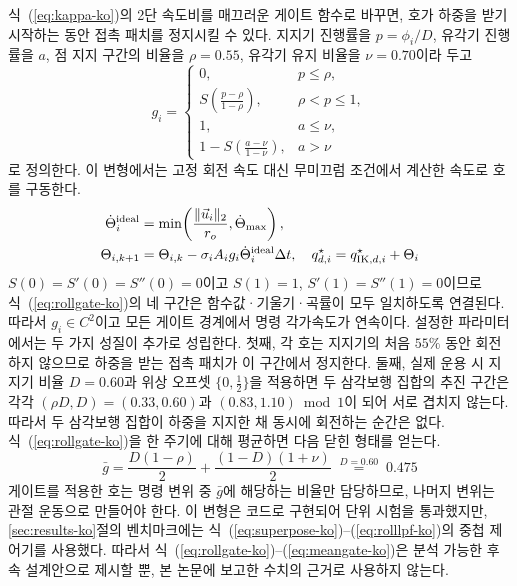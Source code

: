 식~(\ref{eq:kappa-ko})의 2단 속도비를 매끄러운 게이트 함수로 바꾸면, 호가 하중을
받기 시작하는 동안 접촉 패치를 정지시킬 수 있다. 지지기 진행률을
$p=\phi_i/D$, 유각기 진행률을 $a$, 점 지지 구간의 비율을 $\rho=0.55$, 유각기
유지 비율을 $\nu=0.70$이라 두고
\begin{equation}
 g_i=\begin{cases}
 0,&p\le\rho,\\ S\!\left(\frac{p-\rho}{1-\rho}\right),&\rho<p\le1,\\
 1,&a\le\nu,\\1-S\!\left(\frac{a-\nu}{1-\nu}\right),&a>\nu
 \end{cases}                                                   \label{eq:rollgate-ko}
\end{equation}
로 정의한다. 이 변형에서는 고정 회전 속도 대신 무미끄럼 조건에서 계산한 속도로
호를 구동한다.
\begin{align}
 \dot\Theta_i^{\rm ideal}&=\min\!\left(\frac{\|\vec{u}_i\|_2}{r_o},
 \dot\Theta_{\max}\right),                                     \label{eq:rollrate-ko}\\
 \Theta_{i,k+1}&=\Theta_{i,k}-\sigma_iA_i g_i
 \dot\Theta_i^{\rm ideal}\Delta t,\quad
 q_{d,i}^\star=q_{{\rm IK},d,i}^\star+\Theta_i                 \label{eq:accumulate-ko}
\end{align}
$S(0)=S'(0)=S''(0)=0$이고 $S(1)=1$, $S'(1)=S''(1)=0$이므로
식~(\ref{eq:rollgate-ko})의 네 구간은 함수값·기울기·곡률이 모두 일치하도록
연결된다. 따라서 $g_i\in C^2$이고 모든 게이트 경계에서 명령 각가속도가
연속이다. 설정한 파라미터에서는 두 가지 성질이 추가로 성립한다. 첫째, 각 호는
지지기의 처음 $55\%$ 동안 회전하지 않으므로 하중을 받는 접촉 패치가 이 구간에서
정지한다. 둘째, 실제 운용 시 지지기 비율 $D=0.60$과 위상 오프셋
$\{0,\tfrac12\}$을 적용하면 두 삼각보행 집합의 추진 구간은 각각
$(\rho D,D)=(0.33,0.60)$과 $(0.83,1.10)\bmod 1$이 되어 서로 겹치지 않는다.
따라서 두 삼각보행 집합이 하중을 지지한 채 동시에 회전하는 순간은 없다.
식~(\ref{eq:rollgate-ko})을 한 주기에 대해 평균하면 다음 닫힌 형태를 얻는다.
\begin{equation}
 \bar g=\frac{D(1-\rho)}{2}+\frac{(1-D)(1+\nu)}{2}
 \;\overset{D=0.60}{=}\;0.475                                  \label{eq:meangate-ko}
\end{equation}
게이트를 적용한 호는 명령 변위 중 $\bar g$에 해당하는 비율만 담당하므로, 나머지
변위는 관절 운동으로 만들어야 한다. 이 변형은 코드로 구현되어 단위 시험을
통과했지만, \ref{sec:results-ko}절의 벤치마크에는
식~(\ref{eq:superpose-ko})--(\ref{eq:rolllpf-ko})의 중첩 제어기를 사용했다.
따라서 식~(\ref{eq:rollgate-ko})--(\ref{eq:meangate-ko})은 분석 가능한 후속
설계안으로 제시할 뿐, 본 논문에 보고한 수치의 근거로 사용하지 않는다.
\fi

